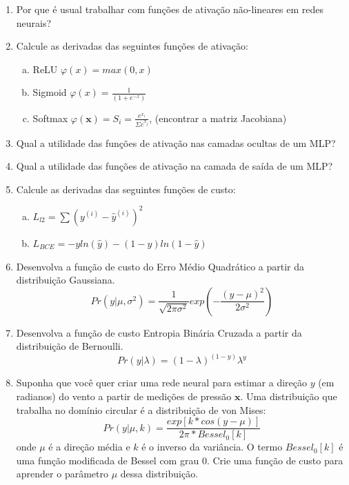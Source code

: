 \documentclass{dlproblemset}
\begin{document}
\begin{enumerate}[1)]
    \item Por que é usual trabalhar com funções de ativação não-lineares em redes neurais?

    \item Calcule as derivadas das seguintes funções de ativação:
    \begin{enumerate}[a)]
        \item ReLU $\varphi(x)=max(0,x)$
        \item Sigmoid $\varphi(x)=\frac{1}{(1+e^{-x})}$
        \item {} Softmax $\varphi(\mathbf{x})=S_i=\frac{e^{x_i}}{\Sigma e^{x_j}}$, (encontrar a matriz Jacobiana)
    \end{enumerate}

    \item Qual a utilidade das funções de ativação nas camadas ocultas de um MLP?

    \item Qual a utilidade das funções de ativação na camada de saída de um MLP?

    \item Calcule as derivadas das seguintes funções de custo:
    \begin{enumerate}[a)]
        \item  $L_{l2}=\sum\left(y^{(i)}-\hat{y}^{(i)}\right)^2$
        \item $L_{BCE}=-yln(\hat{y})-(1-y)ln(1-\hat{y})$
    \end{enumerate}

    \item Desenvolva a função de custo do Erro Médio Quadrático a partir da distribuição Gaussiana.
    \begin{equation*}
        Pr(y|\mu,\sigma^2)=\frac{1}{\sqrt{2\pi\sigma^2}}exp\left(-\frac{(y-\mu)^2}{2\sigma^2}\right)
    \end{equation*}

    \item Desenvolva a função de custo Entropia Binária Cruzada a partir da distribuição de Bernoulli.
    \begin{equation*}
        Pr(y|\lambda)= (1-\lambda)^{(1-y)}\lambda^y
    \end{equation*}

    \item {} Suponha que você quer criar uma rede neural para estimar a direção $y$ (em radianos) do vento a partir de medições de pressão $\mathbf{x}$.
    Uma distribuição que trabalha no domínio circular é a distribuição de von Mises:
    \begin{equation*}
        Pr(y|\mu,k) = \frac{exp[k*cos(y-\mu)]}{2\pi * Bessel_0[k]}
    \end{equation*}
    \noindent onde $\mu$ é a direção média e $k$ é o inverso da variância. O termo $Bessel_0[k]$ é uma função modificada de Bessel com grau 0.
    Crie uma função de custo para aprender o parâmetro $\mu$ dessa distribuição.


\end{enumerate}
\end{document}
